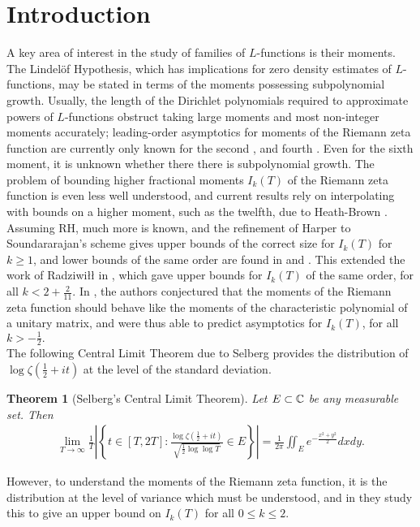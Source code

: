 \documentclass[12pt]{amsart}
\def\C{\ensuremath\mathbb{C}}
\numberwithin{equation}{section}
\newtheorem{thm}{Theorem}
\numberwithin{thm}{section}
\newcommand{\1}{\mathbf 1}
\begin{document}
\section{Introduction}
A key area of interest in the study of families of $L$-functions is their moments. The Lindel\"{o}f Hypothesis, which has implications for zero density estimates of $L$-functions, may be stated in terms of the moments possessing subpolynomial growth. Usually, the length of the Dirichlet polynomials required to approximate powers of $L$-functions obstruct taking large moments and most non-integer moments accurately; leading-order asymptotics for moments of the Riemann zeta function are currently only known for the second \cite{HL}, and fourth \cite{Ing}. Even for the sixth moment, it is unknown whether there there is subpolynomial growth. The problem of bounding higher fractional moments $I_k(T)$ of the Riemann zeta function is even less well understood, and current results rely on interpolating with bounds on a higher moment, such as the twelfth, due to Heath-Brown \cite{HB78}. Assuming RH, much more is known, and the refinement of Harper \cite{Harper} to Soundararajan's scheme \cite{Sound} gives upper bounds of the correct size for $I_k(T)$ for $k\ge 1$, and lower bounds of the same order are found in \cite{RSlower} and \cite{HSlower}. This extended the work of Radziwi\l{\l} in \cite{4.36}, which gave upper bounds for $I_k(T)$ of the same order,
 for all $k<2+\frac{2}{11}.$ In \cite{KS}, the authors conjectured that the moments of the Riemann zeta function should behave like the moments of the characteristic polynomial of a unitary matrix, and were thus able to predict asymptotics for  $I_k(T)$, for all $k>-\frac{1}{2}.$ \\
The following Central Limit Theorem due to Selberg \cite{Sel} provides the distribution of $\log\zeta\left(\frac{1}{2}+it\right)$ at the level of the standard deviation.
\begin{thm}[Selberg's Central Limit Theorem]\label{CLT} Let $E\subset\C$ be any measurable set. Then \begin{align}\label{SCLT}
		\lim_{T\to \infty}\frac{1}{T}\left|\left\{t\in [T,2T]: \frac{\log \zeta\left(\frac{1}{2}+it\right)}{\sqrt{\frac{1}{2}\log\log T}}\in E\right\}\right|=\frac{1}{2\pi}\iint_E e^{-\frac{x^2+y^2}{2}}dxdy.
\end{align} \end{thm}
However, to understand the moments of the Riemann zeta function, it is the distribution at the level of variance which must be understood, and in \cite{AB} they study this to give an upper bound on $I_k(T)$ for all $0\le k\le 2.$  
\end{document}
